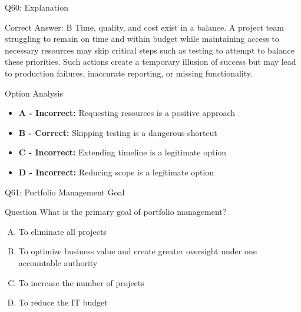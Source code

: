 \documentclass{beamer}
\begin{document}
	\begin{frame}{Q60: Explanation}
		\begin{block}{Correct Answer: B}
			Time, quality, and cost exist in a balance. A project team struggling to remain on time and within budget while maintaining access to necessary resources may skip critical steps such as testing to attempt to balance these priorities. Such actions create a temporary illusion of success but may lead to production failures, inaccurate reporting, or missing functionality.
		\end{block}
		\begin{block}{Option Analysis}
			\begin{itemize}
				\item \textbf{A - Incorrect:} Requesting resources is a positive approach
				\item \textbf{B - Correct:} Skipping testing is a dangerous shortcut
				\item \textbf{C - Incorrect:} Extending timeline is a legitimate option
				\item \textbf{D - Incorrect:} Reducing scope is a legitimate option
			\end{itemize}
		\end{block}
	\end{frame}
	
	\begin{frame}{Q61: Portfolio Management Goal}
		\begin{block}{Question}
			What is the primary goal of portfolio management?
		\end{block}
		\begin{enumerate}[(A)]
			\item To eliminate all projects
			\item To optimize business value and create greater oversight under one accountable authority
			\item To increase the number of projects
			\item To reduce the IT budget
		\end{enumerate}
	\end{frame}
	
\end{document}

